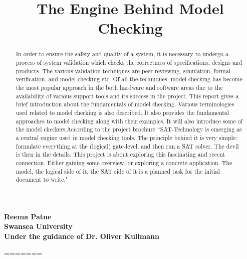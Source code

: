 \documentclass{article}
\begin{document}
\title{ The Engine Behind Model Checking}
\maketitle
\begin{center}
\textbf{Reema Patne \\ Swansea University \\ Under the guidance of Dr. Oliver Kullmann }

\end{center}
\begin{abstract}
In order to ensure the safety and quality of a system, it is necessary to undergo a process of system validation which checks the correctness of specifications, designs and products. The various validation techniques are peer reviewing, simulation, formal verification, and model checking etc. Of all the techniques, model checking has become the most popular approach in the both hardware and software areas due to the availability of various support tools and its success in the project. This report gives a brief introduction about the fundamentals of model checking. Various terminologies used related to model checking is also described. It also provides the fundamental approaches to model checking along with their examples. It will also introduce some of the model checkers.According to the project brochure ``SAT-Technology is emerging as a central engine used in model checking tools. The principle behind it is very simple: formulate everything at the (logical) gate-level, and then run a SAT solver. The devil is then in the details. This project is about exploring this fascinating and recent connection. Either gaining some overview, or exploring a concrete application. The model, the logical side of it, the SAT side of it is a planned task for the initial document to write."


\end{abstract}

\newpage
=======

\usepackage{a4}
\usepackage{graphicx}
\end{document}
